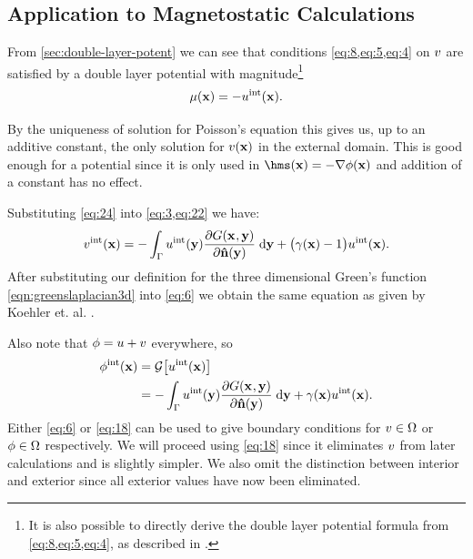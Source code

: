 \subsection{Application to Magnetostatic Calculations}
\label{sec:appl-magn-calc}

From \cref{sec:double-layer-potent} we can see that conditions \cref{eq:8,eq:5,eq:4} on $v$ are satisfied by a double layer potential with magnitude\footnote{It is also possible to directly derive the double layer potential formula from \cref{eq:8,eq:5,eq:4}, as described in \cite[App. 2]{Knittel2011}.}
\begin{equation}
  \label{eq:24}
  \mu(\boldsymbol{\mathrm{x}}) = - u^{\mathrm{int}}(\boldsymbol{\mathrm{x}}).
\end{equation}

By the uniqueness of solution for Poisson's equation this gives us, up to an additive constant, the only solution for $v(\boldsymbol{\mathrm{x}})$ in the external domain.
This is good enough for a potential since it is only used in $\hms(\xv) = - \grad \phim(\xv)$ and addition of a constant has no effect.

Substituting \cref{eq:24} into \cref{eq:3,eq:22} we have:
\begin{equation}
  \label{eq:6}
  v^{\mathrm{int}}(\boldsymbol{\mathrm{x}}) =
  - \int_{{\Gamma}} u^{\mathrm{int}}(\boldsymbol{\mathrm{y}}) \frac{\partial G(\boldsymbol{\mathrm{x}}_{},\boldsymbol{\mathrm{y}})}{\partial \boldsymbol{\mathrm{\hat{n}}}(\boldsymbol{\mathrm{y}})} {\; \mathrm{{d}}} \boldsymbol{\mathrm{y}}
  + \big(\gamma(\boldsymbol{\mathrm{x}}) - 1 \big) u^{\mathrm{int}}(\boldsymbol{\mathrm{x}}).
\end{equation}
After substituting our definition for the three dimensional Green's function \cref{eqn:greenslaplacian3d} into \cref{eq:6} we obtain the same equation as given by Koehler et. al. \cite{Koehler1997}.

Also note that $\phi = u + v$ everywhere, so
\begin{equation}
  \begin{aligned}
    \label{eq:18}
    \phi^{\mathrm{int}}(\boldsymbol{\mathrm{x}}) &= \mathcal{G} \big[ u^{\mathrm{int}}(\boldsymbol{\mathrm{x}}) \big] \\
    &=
    - \int_{{\Gamma}} u^{\mathrm{int}}(\boldsymbol{\mathrm{y}}) \frac{\partial G(\boldsymbol{\mathrm{x}}_{},\boldsymbol{\mathrm{y}})}{\partial \boldsymbol{\mathrm{\hat{n}}}(\boldsymbol{\mathrm{y}})} {\; \mathrm{{d}}} \boldsymbol{\mathrm{y}}
    + \gamma(\boldsymbol{\mathrm{x}}) u^{\mathrm{int}}(\boldsymbol{\mathrm{x}}).
  \end{aligned}
\end{equation}
Either \cref{eq:6} or \cref{eq:18} can be used to give boundary conditions for $v \in \Omega$ or $\phi \in \Omega$ respectively.
We will proceed using \cref{eq:18} since it eliminates $v$ from later calculations and is slightly simpler.
We also omit the distinction between interior and exterior since all exterior values have now been eliminated.

